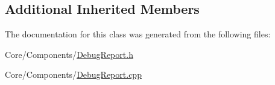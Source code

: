 \subsection*{Additional Inherited Members}


The documentation for this class was generated from the following files\-:\begin{DoxyCompactItemize}
\item 
Core/\-Components/\hyperlink{DebugReport_8h}{Debug\-Report.\-h}\item 
Core/\-Components/\hyperlink{DebugReport_8cpp}{Debug\-Report.\-cpp}\end{DoxyCompactItemize}
